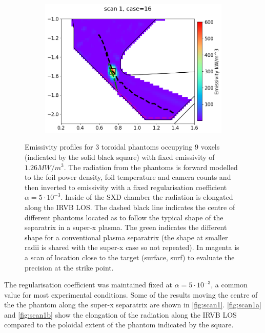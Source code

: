 \begin{figure}[!ht]
\begin{subfigure}{0.32\linewidth}
         \centering
         \includegraphics[trim={50 0 0 35},clip,width=\textwidth]{Chapters/chapter2/figs/phantom_example3.png}
         \caption{}
         \label{fig:scan1c}
     \end{subfigure}
    \caption{Emissivity profiles for 3 toroidal phantoms occupying 9 voxels (indicated by the solid black square) with fixed emissivity of $1.26MW/m^3$. The radiation from the phantoms is forward modelled to the foil power density, foil temperature and camera counts and then inverted to emissivity with a fixed regularisation coefficient $\alpha=5 \cdot 10^{-3}$. Inside of the SXD chamber the radiation is elongated along the IRVB LOS. The dashed black line indicates the centre of different phantoms located as to follow the typical shape of the separatrix in a super-x plasma. The green indicates the different shape for a conventional plasma separatrix (the shape at smaller radii is shared with the super-x case so not repeated). In magenta is a scan of location close to the target (surface, surf) to evaluate the precision at the strike point.}
    \label{fig:scan1}
\end{figure}
The regularisation coefficient was maintained fixed at $\alpha=5 \cdot 10^{-3}$, a common value for most experimental conditions. Some of the results moving the centre of the the phantom along the super-x separatrix are shown in \autoref{fig:scan1}. \autoref{fig:scan1a} and \ref{fig:scan1b} show the elongation of the radiation along the IRVB LOS compared to the poloidal extent of the phantom indicated by the square.

